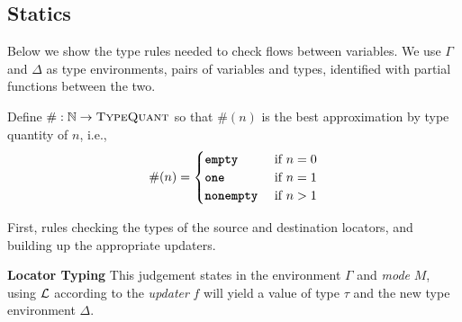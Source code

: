 \documentclass[nonacm, dvipsnames, sigconf]{acmart}
\begin{document}
\subsection{Statics}
Below we show the type rules needed to check flows between variables.
We use $\Gamma$ and $\Delta$ as type environments, pairs of variables and types, identified with partial functions between the two.

Define $\# : \mathbb{N} \to \textsc{TypeQuant}$ so that $\#(n)$ is the best approximation by type quantity of $n$, i.e.,
\[
    \#(n) =
    \begin{cases}
        \textbf{\texttt{empty}} & ~\text{if}~ n = 0 \\
        \textbf{\texttt{one}} & ~\text{if}~ n = 1 \\
        \textbf{\texttt{nonempty}} & ~\text{if}~ n > 1 \\
    \end{cases}
\]

First, rules checking the types of the source and destination locators, and building up the appropriate updaters.


 \textbf{Locator Typing}
This judgement states in the environment $\Gamma$ and \emph{mode} $M$, using $\mathcal{L}$ according to the \emph{updater} $f$ will yield a value of type $\tau$ and the new type environment $\Delta$.
\end{document}
